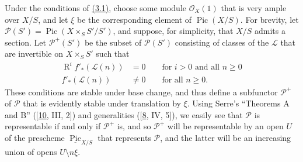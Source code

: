 \documentclass{article}
\theoremstyle{definition}
\theoremstyle{definition}
\theoremstyle{definition}
\theoremstyle{definition}
\theoremstyle{remark}
\begin{document}
Under the conditions of \protect\hyperlink{fga-3-v-theorem-3.1}{(3.1)}, choose some module \({\mathscr{O}}_X(1)\) that is very ample over \(X/S\), and let \(\xi\) be the corresponding element of \(\operatorname{Pic}(X/S)\).
For brevity, let \({\mathscr{P}}(S')=\operatorname{Pic}(X\times_S S'/S')\), and suppose, for simplicity, that \(X/S\) admits a section.
Let \({\mathscr{P}}^+(S')\) be the subset of \({\mathscr{P}}(S')\) consisting of classes of the \({\mathscr{L}}\) that are invertible on \(X\times_S S'\) such that
\[
  \begin{aligned}
    \operatorname{R}^i f'_*({\mathscr{L}}(n)) &= 0
    \qquad\text{for }i>0\text{ and all }n\geqslant 0
  \\f'_*({\mathscr{L}}(n)) &\neq0
    \qquad\text{for all }n\geqslant 0.
  \end{aligned}
\]
These conditions are stable under base change, and thus define a subfunctor \({\mathscr{P}}^+\) of \({\mathscr{P}}\) that is evidently stable under translation by \(\xi\).
Using Serre's ``Theorems A and B'' ({[}\protect\hyperlink{ref-GD1960}{10}, III, 2{]}) and generalities ({[}\protect\hyperlink{ref-Gro1960a}{8}, IV, 5{]}), we easily see that \({\mathscr{P}}\) is representable if and only if \({\mathscr{P}}^+\) is, and so \({\mathscr{P}}^+\) will be representable by an open \(U\) of the prescheme \(\underline{\operatorname{Pic}}_{X/S}\) that represents \({\mathscr{P}}\), and the latter will be an increasing union of opens \(U\setminus n\xi\).
\end{document}
